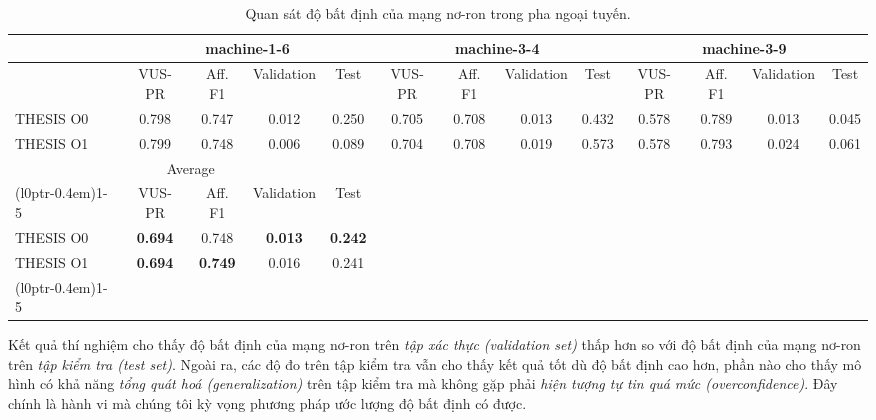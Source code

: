 \pagebreak
\begin{table}[htbp]
\centering
\caption{Quan sát độ bất định của mạng nơ-ron trong pha ngoại tuyến.}
\label{tab:offline-phase-table-2}
\scriptsize
\setlength{\tabcolsep}{2.5pt}
\begin{adjustbox}{max width=\textwidth}
\begin{tabular}{lcccccccccccc}
\toprule
\multirow{2}{*}{} & \multicolumn{4}{c}{machine-1-6} & \multicolumn{4}{c}{machine-3-4} & \multicolumn{4}{c}{machine-3-9} \\
\midrule
 & VUS-PR & Aff. F1 & Validation & Test & VUS-PR & Aff. F1 & Validation & Test & VUS-PR & Aff. F1 & Validation & Test \\
THESIS O0 & 0.798 & 0.747 & 0.012 & 0.250 & 0.705 & 0.708 & 0.013 & 0.432 & 0.578 & 0.789 & 0.013 & 0.045 \\
THESIS O1 & 0.799 & 0.748 & 0.006 & 0.089 & 0.704 & 0.708 & 0.019 & 0.573 & 0.578 & 0.793 & 0.024 & 0.061 \\
\midrule
\multicolumn{5}{c}{Average} \\
\cmidrule[1.2pt](l{0pt}r{-0.4em}){1-5}
 & VUS-PR & Aff. F1 & Validation & Test & \multicolumn{8}{c}{} \\
THESIS O0 & \textbf{0.694} & 0.748 & \textbf{0.013} & \textbf{0.242} & \multicolumn{8}{c}{} \\
THESIS O1 & \textbf{0.694} & \textbf{0.749} & 0.016 & 0.241 & \multicolumn{8}{c}{} \\
\cmidrule[1.2pt](l{0pt}r{-0.4em}){1-5}
\cmidrule(lr){1-5}
\end{tabular}
\end{adjustbox}
\end{table}

Kết quả thí nghiệm cho thấy độ bất định của mạng nơ-ron trên \textit{tập xác thực (validation set)} thấp hơn so với độ bất định của mạng nơ-ron trên \textit{tập kiểm tra (test set)}. Ngoài ra, các độ đo trên tập kiểm tra vẫn cho thấy kết quả tốt dù độ bất định cao hơn, phần nào cho thấy mô hình có khả năng \textit{tổng quát hoá (generalization)} trên tập kiểm tra mà không gặp phải \textit{hiện tượng tự tin quá mức (overconfidence)}. Đây chính là hành vi mà chúng tôi kỳ vọng phương pháp ước lượng độ bất định có được.

